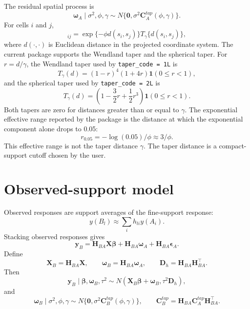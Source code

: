 \documentclass[11pt]{article}
\newcommand{\by}{\bm{y}}
\newcommand{\bbeta}{\bm{\beta}}
\newcommand{\bw}{\bm{\omega}}
\newcommand{\beps}{\bm{\epsilon}}
\newcommand{\bzero}{\bm{0}}
\newcommand{\bC}{\bm{C}}
\newcommand{\bD}{\bm{D}}
\newcommand{\bH}{\bm{H}}
\newcommand{\bX}{\bm{X}}
\newcommand{\trans}{^\top}
\begin{document}
The residual spatial process is
\begin{equation}
  \bw_A\mid\sigma^2,\phi,\gamma
  \sim N\{\bzero,\sigma^2\bC_A^{tap}(\phi,\gamma)\}.
\end{equation}
For cells \(i\) and \(j\),
\begin{equation}
  [\bC_A^{tap}(\phi,\gamma)]_{ij}
  =
  \exp\{-\phi d(s_i,s_j)\}T_\gamma\{d(s_i,s_j)\},
\end{equation}
where \(d(\cdot,\cdot)\) is Euclidean distance in the projected coordinate
system. The current package supports the Wendland taper and the spherical
taper. For \(r=d/\gamma\), the Wendland taper used by
\texttt{taper\_code = 1L} is
\begin{equation}
  T_\gamma(d) =
  (1-r)^4(1+4r)\bm{1}(0\leq r < 1),
\end{equation}
and the spherical taper used by \texttt{taper\_code = 2L} is
\begin{equation}
  T_\gamma(d) =
  \left(1-\frac{3}{2}r+\frac{1}{2}r^3\right)\bm{1}(0\leq r < 1).
\end{equation}
Both tapers are zero for distances greater than or equal to \(\gamma\). The
exponential effective range reported by the package is the
distance at which the exponential component alone drops to 0.05:
\begin{equation}
  r_{0.05} = -\log(0.05)/\phi \approx 3/\phi.
\end{equation}
This effective range is not the taper distance \(\gamma\). The taper distance
is a compact-support cutoff chosen by the user.

\section{Observed-support model}

Observed responses are support averages of the fine-support response:
\begin{equation}
  y(B_l) \approx \sum_i h_{li}y(A_i).
\end{equation}
Stacking observed responses gives
\begin{equation}
  \by_B =
  \bH_{BA}\bX\bbeta +
  \bH_{BA}\bw_A +
  \bH_{BA}\beps_A.
\end{equation}
Define
\begin{equation}
  \bX_B=\bH_{BA}\bX,\qquad
  \bw_B=\bH_{BA}\bw_A,\qquad
  \bD_h=\bH_{BA}\bH_{BA}\trans .
\end{equation}
Then
\begin{equation}
  \by_B\mid\bbeta,\bw_B,\tau^2
  \sim
  N(\bX_B\bbeta+\bw_B,\tau^2\bD_h),
\end{equation}
and
\begin{equation}
  \bw_B\mid\sigma^2,\phi,\gamma
  \sim
  N\{\bzero,\sigma^2\bC_B^{tap}(\phi,\gamma)\},
  \qquad
  \bC_B^{tap}=\bH_{BA}\bC_A^{tap}\bH_{BA}\trans .
\end{equation}
\end{document}
